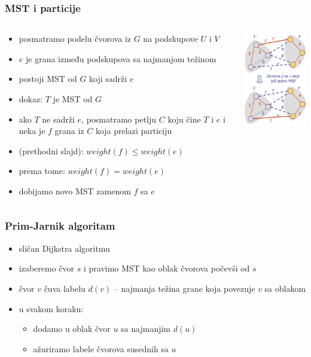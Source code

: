 \documentclass[compress]{beamer}
\begin{document}
\begin{frame}[fragile]
  \frametitle{MST i particije}
  \begin{columns}
    \begin{column}[t]{7cm}
      \begin{itemize}
        \item posmatramo podelu čvorova iz $G$ na podskupove $U$ i $V$
        \item $e$ je grana između podskupova sa najmanjom težinom
        \item postoji MST od $G$ koji sadrži $e$
        \item dokaz: $T$ je MST od $G$
        \item ako $T$ ne sadrži $e$, posmatramo petlju $C$ koju čine $T$
          i $e$ i neka je $f$ grana iz $C$ koja prelazi particiju
        \item (prethodni slajd): $weight(f)\leq weight(e)$
        \item prema tome: $weight(f)=weight(e)$
        \item dobijamo novo MST zamenom $f$ sa $e$
      \end{itemize}
    \end{column}
    \begin{column}[t]{5cm}
      \begin{center}
        \includegraphics[width=4.5cm]{asp-14-pic71.png}
      \end{center}
    \end{column}
  \end{columns}
\end{frame}

\begin{frame}[fragile]
  \frametitle{Prim-Jarnik algoritam}
  \begin{itemize}
    \item sličan Dijkstra algoritmu
    \item izaberemo čvor $s$ i pravimo MST kao oblak čvorova počevši od 
      $s$
    \item čvor $v$ čuva labelu $d(v)$ -- najmanja težina grane koja
      povezuje $v$ sa oblakom
    \item u svakom koraku:
    \begin{itemize}
      \item dodamo u oblak čvor $u$ sa najmanjim $d(u)$
      \item ažuriramo labele čvorova susednih sa $u$
    \end{itemize}
  \end{itemize}
\end{frame}
\end{document}
